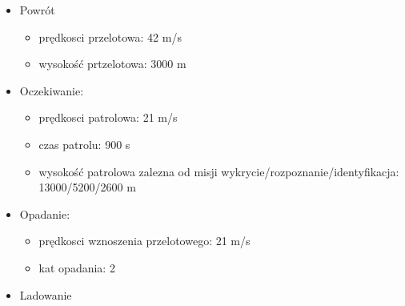 \begin{itemize}
\begin{itemize}
                \item kat opadania: 5\textdegree
            \end{itemize}
        \item Powrót
            \begin{itemize}
                \item prędkosci przelotowa: 42 m/s 
                \item wysokość prtzelotowa: 3000 m
            \end{itemize}
        \item Oczekiwanie: 
            \begin{itemize}
                \item prędkosci patrolowa: 21 m/s
                \item czas patrolu: 900 s
                \item wysokość patrolowa zalezna od misji wykrycie/rozpoznanie/identyfikacja: 13000/5200/2600 m
            \end{itemize}
        \item Opadanie:
            \begin{itemize}
                \item prędkosci wznoszenia przelotowego: 21 m/s 
                \item kat opadania: 2\textdegree
            \end{itemize}
        \item Ladowanie
    \end{itemize}